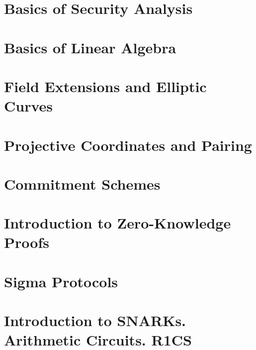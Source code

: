 \documentclass{zkdl-template}
\begin{document}


\section{Basics of Security Analysis}\label{section:math-crypto-2}



\section{Basics of Linear Algebra}\label{section:linear-algebra}



\section{Field Extensions and Elliptic Curves}\label{section:field_extensions}



\section{Projective Coordinates and Pairing}



\section{Commitment Schemes}\label{section:commitments}



\section{Introduction to Zero-Knowledge Proofs}\label{section:intro-zk}



\section{Sigma Protocols}\label{section:sigma}



\section[Arithmetic Circuits. R1CS]{Introduction to SNARKs. Arithmetic Circuits. R1CS} \label{section:r1cs}
\end{document}
